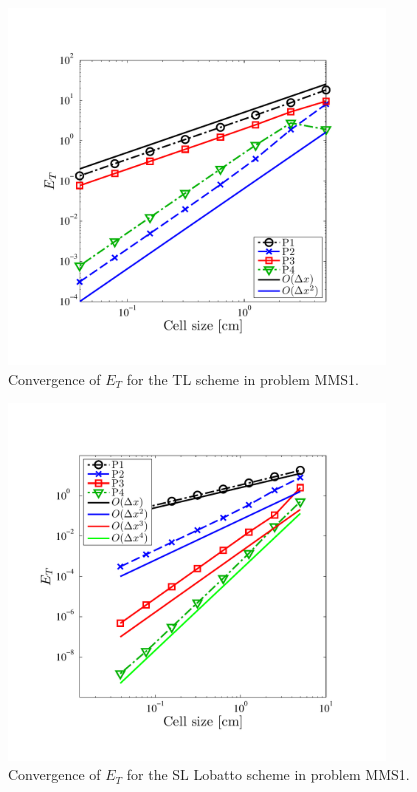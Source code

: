 \begin{figure}[!hbp]
\centering
\includegraphics[width=10cm,trim=0.25in  0.5in 0.75in 0.75in,clip=true]{chapter6_grey_radtran/Dissertation_Data/MMS2_TL_temp_L2.pdf}
\caption{Convergence of $E_{T}$ for the TL scheme in problem MMS1.}
\label{fig:mms1_tl_temp}
\end{figure}
%
%
\begin{figure}[!htp]
\centering
\includegraphics[width=10cm,trim=0.25in  0.5in 0.75in 0.75in,clip=true]{chapter6_grey_radtran/Dissertation_Data/MMS2_SLXS_Lobatto_temp_L2.pdf}
\caption{Convergence of $E_{T}$ for the SL Lobatto scheme in problem MMS1.}
\label{fig:mms1_lobatto_temp}
\end{figure}
%
%
